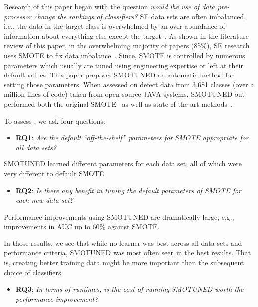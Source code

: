 \documentclass[sigconf,review, anonymous]{acmart}
\newcommand{\bi}{\begin{itemize}[leftmargin=0.4cm]}
\newcommand{\ei}{\end{itemize}}
\theoremstyle{break}
\theoremstyle{break}
\newcommand{\sma}{{\sc SMOTE}}
\newcommand{\smb}{{\sc SMOTUNED}}
\begin{document}
Research of this paper began with the question {\em would the use of
data pre-processor change the rankings of classifiers?}
SE data
sets are often imbalanced, i.e., the data in the target class is overwhelmed by an over-abundance of information about everything else except the target~\cite{menzies2007problems}.
As shown in the literature review of this paper, in the overwhelming majority of papers (85\%), SE research uses {\sma} to fix data imbalance~\cite{chawla2002smote}. Since, {\sma} is controlled by numerous parameters which
usually are tuned using engineering expertise or left at their default
values. This paper proposes 
{\smb} an automatic method for setting those parameters.
When assessed on  defect data from 3,681	 classes (over a million lines of code) 
taken from open source JAVA systems,  {\smb} out-performed
both the original SMOTE~\cite{chawla2002smote} as well as state-of-the-art methods~\cite{bennin2017mahakil}.

To assess {\emb}, we ask four questions: 
 \bi\item
  \textbf{RQ1}:  {\em Are the default ``off-the-shelf'' parameters for {\sma} appropriate for
  all data sets?} 
  \ei
 \begin{lesson}{\smb} learned different parameters for each data set, all of which  were very different to default {\sma}.
 \end{lesson}
  \bi
  \item
  \textbf{RQ2}: {\em   Is  there any benefit in tuning the default parameters of {\sma} for
  each new data set?} 
  \ei
   \begin{lesson}Performance improvements using {\smb} are dramatically large, e.g., improvements in AUC up to 60\% against {\sma}.
 \end{lesson}
In those results, we see that  while no learner was best across all data sets and   performance criteria,
{\smb} was most often seen in the best results.
That is, creating better training data might be more important
than the subsequent choice of classifiers. 
 
  
   \bi
  \item
  \textbf{RQ3}: {\em  In terms of runtimes, is the cost of running {\smb} worth the performance improvement?}
  \ei
  
\end{document}
